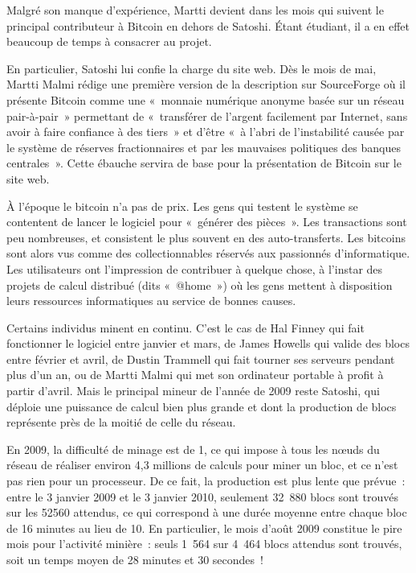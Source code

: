 Malgré son manque d'expérience, Martti devient dans les mois qui suivent le principal contributeur à Bitcoin en dehors de Satoshi. Étant étudiant, il a en effet beaucoup de temps à consacrer au projet.

En particulier, Satoshi lui confie la charge du site web. Dès le mois de mai, Martti Malmi rédige une première version de la description sur SourceForge où il présente Bitcoin comme une «~monnaie numérique anonyme basée sur un réseau pair-à-pair~» permettant de «~transférer de l'argent facilement par Internet, sans avoir à faire confiance à des tiers~» et d'être «~à l'abri de l'instabilité causée par le système de réserves fractionnaires et par les mauvaises politiques des banques centrales~». Cette ébauche servira de base pour la présentation de Bitcoin sur le site web.


À l'époque le bitcoin n'a pas de prix. Les gens qui testent le système se contentent de lancer le logiciel pour «~générer des pièces~». Les transactions sont peu nombreuses, et consistent le plus souvent en des auto-transferts. Les bitcoins sont alors vus comme des collectionnables réservés aux passionnés d'informatique. Les utilisateurs ont l'impression de contribuer à quelque chose, à l'instar des projets de calcul distribué (dits «~@home~») où les gens mettent à disposition leurs ressources informatiques au service de bonnes causes.

Certains individus minent en continu. C'est le cas de Hal Finney qui fait fonctionner le logiciel entre janvier et mars, de James Howells qui valide des blocs entre février et avril, de Dustin Trammell qui fait tourner ses serveurs pendant plus d'un an, ou de Martti Malmi qui met son ordinateur portable à profit à partir d'avril. Mais le principal mineur de l'année de 2009 reste Satoshi, qui déploie une puissance de calcul bien plus grande et dont la production de blocs représente près de la moitié de celle du réseau.

En 2009, la difficulté de minage est de 1, ce qui impose à tous les nœuds du réseau de réaliser environ 4,3 millions de calculs pour miner un bloc, et ce n'est pas rien pour un processeur. De ce fait, la production est plus lente que prévue~: entre le 3 janvier 2009 et le 3 janvier 2010, seulement 32~880 blocs sont trouvés sur les 52560 attendus, ce qui correspond à une durée moyenne entre chaque bloc de 16 minutes au lieu de 10. En particulier, le mois d'août 2009 constitue le pire mois pour l'activité minière~: seuls 1~564 sur 4~464 blocs attendus sont trouvés, soit un temps moyen de 28 minutes et 30 secondes~!

